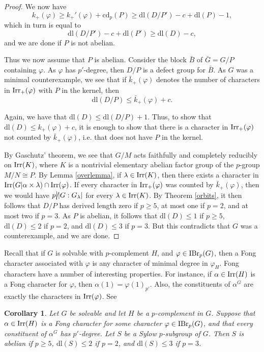 \documentclass[11pt]{amsart}
\newtheorem{corollary}[theorem]{Corollary}
\newcommand \irr {\textup{Irr}}
\newcommand \ibr {{\textup{IBr}}_p}
\newcommand{\dl}{\mathrm {dl}}
\newcommand{\cd}{{\mathrm {cd}}}
\newcommand \dvd {\hbox {\big|}}
\newcommand \ndvd {\hbox {/}\kern-5pt\dvd}
\begin{document}
\begin{proof}
We now have $$k_+(\varphi) \geq k_+'(\varphi) + \cd_p(P) \geq \dl(D/P') - c + \dl(P) - 1,$$ which in turn is equal to $$\dl(D/P') - c + \dl(P')  \geq \dl(D) - c,$$ and we are done if $P$ is not abelian. 

Thus we now assume that $P$ is abelian.  Consider the block $\bar{B}$ of $\bar{G} = G/P$ containing $\varphi$.  As $\varphi$ has $p'$-degree, then $D/P$ is a defect group for ${\bar{B}}$.  As $G$ was a minimal counterexample, we see that if ${\bar{k}}_+(\varphi)$ denotes the number of characters in $\irr_+(\varphi)$ with $P$ in the kernel, then $$\dl(D/P) \leq {\bar{k}}_+(\varphi) + c.$$  

Again, we have that $\dl(D) \leq \dl(D/P ) + 1$.  Thus, to show that $\dl(D) \leq k_+(\varphi) + c$, it is enough to show that there is a character in $\irr_+(\varphi)$ not counted by ${\bar{k}}_+(\varphi)$, i.e. that does not have $P$ in the kernel.

By Gaschutz' theorem, we see that $G/M$ acts faithfully and completely reducibly on $\irr(K)$, where $K$ is a nontrivial elementary abelian factor group of the $p$-group $M/N \cong P$.  By Lemma \ref{overlemma}, if $\lambda \in \irr(K)$, then there exists a character in $\irr(G | \alpha \times \lambda) \cap \irr(\varphi)$.  If every character in $\irr_+(\varphi)$ was counted by ${\bar{k}}_+(\varphi)$, then we would have $p \ndvd |G : G_{\lambda}|$ for every $\lambda \in \irr(K)$.  By Theorem \ref{orbits}, it then follows that $D/P$ has derived length zero if $p \geq 5$, at most one if $p = 2$, and at most two if $p = 3$.  As $P$ is abelian, it follows that $\dl(D) \leq 1$ if $p \geq 5$, $\dl(D) \leq 2$ if $p = 2$, and $\dl(D) \leq 3$ if $p = 3$.  But this contradicts that $G$ was a counterexample, and we are done. 
\end{proof}

Recall that if $G$ is solvable with $p$-complement $H$, and $\varphi \in \ibr(G)$, then a Fong character associated with $\varphi$ is any character of minimal degree in $\varphi_H$.  Fong characters have a number of interesting properties.  For instance, if $\alpha \in \irr(H)$ is a Fong character for $\varphi$, then $\alpha(1) = \varphi(1)_{p'}$.  Also, the constituents of $\alpha^G$ are exactly the characters in $\irr(\varphi)$.  See \cite{isaacsfong}

\begin{corollary}\label{fong}  Let $G$ be solvable and let $H$ be a $p$-complement in $G$.  Suppose that $\alpha \in \irr(H)$ is a Fong character for some character $\varphi \in \ibr(G)$, and that every constituent of $\alpha^G$ has $p'$-degree.  Let $S$ be a Sylow $p$-subgroup of $G$.  Then $S$ is abelian if $p \geq 5$, $\dl(S) \leq 2$ if $p = 2$, and $\dl(S) \leq 3$ if $p = 3$.
\end{corollary}
\end{document}

